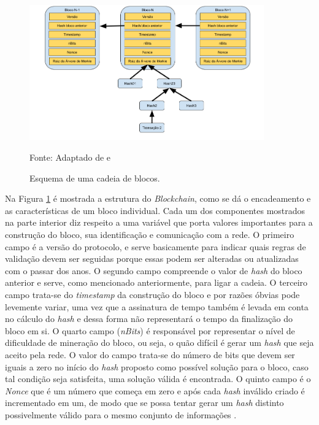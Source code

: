 \begin{figure}[ht]
\caption{Esquema de uma cadeia de blocos.}
\centering
\includegraphics[width=0.9\textwidth]{imagens/esquema_blockchain.png}
\begin{center}
        Fonte: Adaptado de \cite{blockchain:bitcoin_whitepaper} e \cite{blockchain:seguranca_desafios}
\end{center}
\label{fig:esquema_blockchain}
\end{figure}

Na Figura \ref{fig:esquema_blockchain} é mostrada a estrutura do \textit{Blockchain}, como se dá o encadeamento e as características de um bloco individual. 
%
Cada um dos componentes mostrados na parte interior diz respeito a uma variável que porta valores importantes para a construção do bloco, sua identificação e comunicação com a rede.
%
O primeiro campo é a versão do protocolo, e serve basicamente para indicar quais regras de validação devem ser seguidas porque essas podem ser alteradas ou atualizadas com o passar dos anos.
%
O segundo campo compreende o valor de \textit{hash} do bloco anterior e serve, como mencionado anteriormente, para ligar a cadeia. O terceiro campo trata-se do \textit{timestamp} da construção do bloco e por razões óbvias pode levemente variar, uma vez que a assinatura de tempo também é levada em conta no cálculo do \textit{hash} e dessa forma não representará o tempo da finalização do bloco em si.
%
O quarto campo (\textit{nBits}) é responsável por representar o nível de dificuldade de mineração do bloco, ou seja, o quão difícil é gerar um \textit{hash} que seja aceito pela rede. O valor do campo trata-se do número de bits que devem ser iguais a zero no início do \textit{hash} proposto como possível solução para o bloco, caso tal condição seja satisfeita, uma solução válida é encontrada.
%
O quinto campo é o \textit{Nonce} que é um número que começa em zero e após cada \textit{hash} inválido criado é incrementado em um, de modo que se possa tentar gerar um \textit{hash} distinto possivelmente válido para o mesmo conjunto de informações \cite{blockchain:mastering_bitcoin}.

